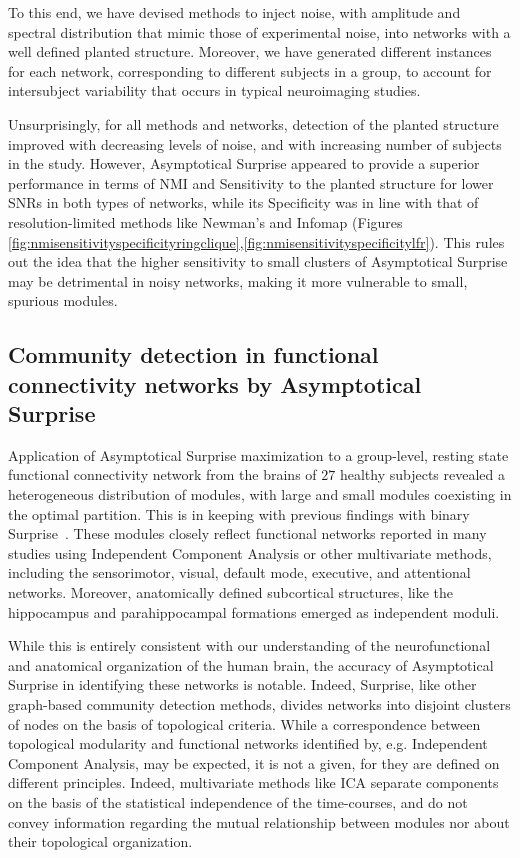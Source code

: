 To this end, we have devised methods to inject noise, with amplitude and spectral distribution that mimic those of experimental noise, into networks with a well defined planted structure. Moreover, we have generated different instances for each network, corresponding to different subjects in a group, to account for intersubject variability that occurs in typical neuroimaging studies. 

Unsurprisingly, for all methods and networks, detection of the planted structure improved with decreasing levels of noise, and with increasing number of subjects in the study.
However, Asymptotical Surprise appeared to provide a superior performance in terms of NMI and Sensitivity to the planted structure for lower SNRs in both types of networks, while its Specificity was in line with that of resolution-limited methods like Newman's and Infomap (Figures \ref{fig:nmisensitivityspecificityringclique},\ref{fig:nmisensitivityspecificitylfr}).
This rules out the idea that the higher sensitivity to small clusters of Asymptotical Surprise may be detrimental in noisy networks, making it more vulnerable to small, spurious modules.

\subsection{Community detection in functional connectivity networks by Asymptotical Surprise}

Application of Asymptotical Surprise maximization to a group-level, resting state functional connectivity network from the brains of $27$ healthy subjects revealed a heterogeneous distribution of modules, with large and small modules coexisting in the optimal partition.
This is in keeping with previous findings with binary Surprise~\cite{nicolini2016}.
These modules closely reflect functional networks reported in many studies using Independent Component Analysis or other multivariate methods, including the sensorimotor, visual, default mode, executive, and attentional networks.
Moreover, anatomically defined subcortical structures, like the hippocampus and parahippocampal formations emerged as independent moduli.

While this is entirely consistent with our understanding of the neurofunctional and anatomical organization of the human brain, the accuracy of Asymptotical Surprise in identifying these networks is notable.
Indeed, Surprise, like other graph-based community detection methods, divides networks into disjoint clusters of nodes on the basis of topological criteria.
While a correspondence between topological modularity and functional networks identified by, e.g. Independent Component Analysis, may be expected, it is not a given, for they are defined on different principles. Indeed, multivariate methods like ICA separate components on the basis of the statistical independence of the time-courses, and do not convey information regarding the mutual relationship between modules nor about their topological organization.

